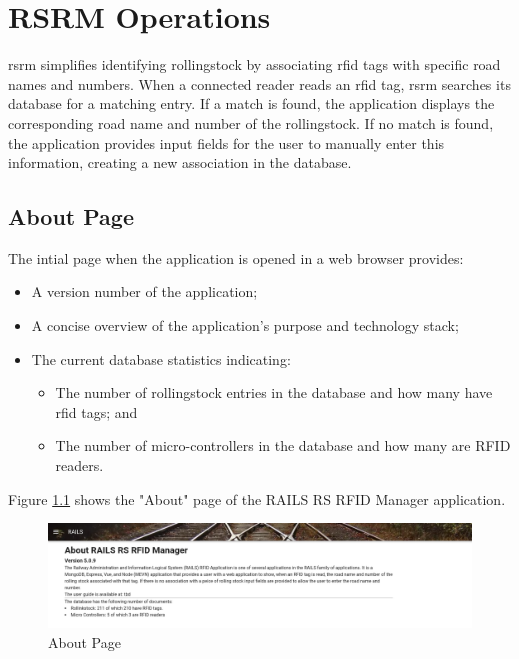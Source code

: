 \newcommand{\hamburger}{%
  \vbox{%
    \hrule width 1em height 1pt\smallskip
    \hrule width 1em height 1pt\smallskip
    \hrule width 1em height 1pt}%
}
\chapter{RSRM Operations}
\gls{rsrm} simplifies identifying rollingstock by associating \gls{rfid} tags with specific road names and numbers.
When a connected reader reads an \gls{rfid} tag, \gls{rsrm} searches its database for a matching entry. If a match is found, the application displays the corresponding 
road name and number of the rollingstock. If no match is found, the application provides input fields for the user to manually enter this information, 
creating a new association in the database.

\section{About Page}

The intial page when the application is opened in a web browser provides:
\begin{itemize}
    \item A version number of the application;
    \item A concise overview of the application's purpose and technology stack;
    \item The current database statistics indicating:
    \begin{itemize}
        \item The number of rollingstock entries in the database and how many have \gls{rfid} tags; and
        \item The number of micro-controllers in the database and how many are RFID readers.
    \end{itemize}
\end{itemize}
Figure \ref{fig:about1} shows the "About" page of the RAILS RS RFID Manager application.

\begin{figure}[H]
    \centering
    \includegraphics[scale=0.33]{./images/about.png}
    \caption{About Page}
    \label{fig:about1}
\end{figure}

